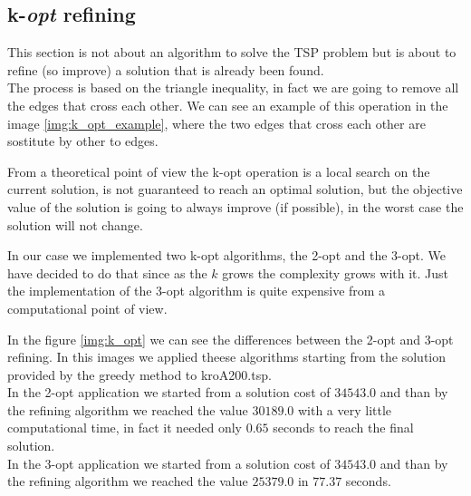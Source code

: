 \subsection{k-\textit{opt} refining}
This section is not about an algorithm to solve the TSP problem but is about to refine (so improve) a solution that is already been found.\\
The process is based on the triangle inequality, in fact we are going to remove all the edges that cross each other. We can see an example of this operation in the image \ref{img:k_opt_example}, where the two edges that cross each other are sostitute by other to edges.

From a theoretical point of view the k-opt operation is a local search on the current solution, is not guaranteed to reach an optimal solution, but the objective value of the solution is going to always improve (if possible), in the worst case the solution will not change.

In our case we implemented two k-opt algorithms, the 2-opt and the 3-opt. We have decided to do that since as the $k$ grows the complexity grows with it. Just the implementation of the 3-opt algorithm is quite expensive from a computational point of view.

In the figure \ref{img:k_opt} we can see the differences between the 2-opt and 3-opt refining. In this images we applied theese algorithms starting from the solution provided by the greedy method to kroA200.tsp. \\
In the 2-opt application we started from a solution cost of $34543.0$ and than by the refining algorithm we reached the value $30189.0$ with a very little computational time, in fact it needed only $0.65$ seconds to reach the final solution.\\
In the 3-opt application we started from a solution cost of $34543.0$ and than by the refining algorithm we reached the value $25379.0$ in $77.37$ seconds.\\


